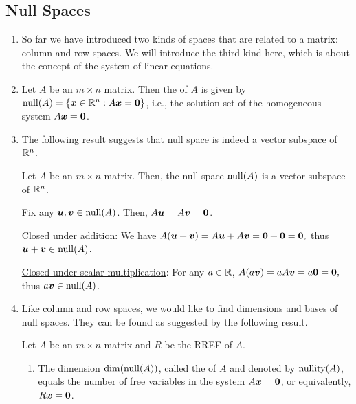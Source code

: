 \subsection{Null Spaces}
\label{subsect:null-sp}
\begin{enumerate}
\item So far we have introduced two kinds of spaces that are related to a
matrix: column and row spaces. We will introduce the third kind here, which is
about the concept of the system of linear equations.

\item Let \(A\) be an \(m\times n\) matrix. Then the  of \(A\)
is given by \(\operatorname{null}(A)=\{\vb*{x}\in\mathbb{R}^n:A\vb*{x}=\vb*{0}\}\), i.e., the
solution set of the homogeneous system \(A\vb*{x}=\vb*{0}\).

\item The following result suggests that null space is indeed a vector
subspace of \(\mathbb{R}^n\).

\begin{theorem}
\label{thm:null-sp-vec-subsp}
Let \(A\) be an \(m\times n\) matrix. Then, the null space \(\operatorname{null}(A)\) is a
vector subspace of \(\mathbb{R}^n\).
\end{theorem}
\begin{pf}
Fix any \(\vb*{u},\vb*{v}\in \operatorname{null}(A)\). Then, \(A\vb*{u}=A\vb*{v}=\vb*{0}\).

\underline{Closed under addition}: We have
\(A(\vb*{u}+\vb*{v})=A\vb*{u}+A\vb*{v}=\vb*{0}+\vb*{0}=\vb*{0},\) thus
\(\vb*{u}+\vb*{v}\in\operatorname{null}(A)\).

\underline{Closed under scalar multiplication}: For any \(a\in\mathbb{R}\),
\(A(a\vb*{v})=aA\vb*{v}=a\vb*{0}=\vb*{0},\) thus \(a\vb*{v}\in\operatorname{null}(A)\).
\end{pf}

\item Like column and row spaces, we would like to find dimensions and bases of
null spaces. They can be found as suggested by the following result.

\begin{theorem}
\label{thm:null-sp-dim-basis}
Let \(A\) be an \(m\times n\) matrix and \(R\) be the RREF of \(A\).
\begin{enumerate}
\item The dimension \(\dim(\operatorname{null}(A))\), called the  of
\(A\) and denoted by \(\operatorname{nullity}(A)\), equals the number of free variables
in the system \(A\vb*{x}=\vb*{0}\), or equivalently, \(R\vb*{x}=\vb*{0}\).


\end{enumerate}
\end{theorem}
\end{enumerate}
